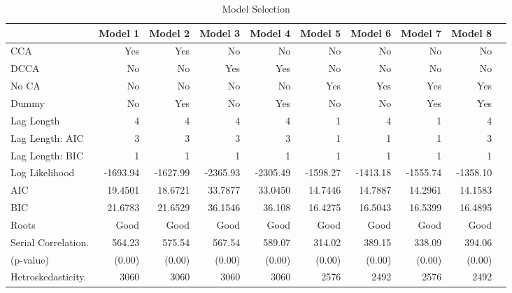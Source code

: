 \documentclass[12pt, a4paper, oneside]{article}\usepackage[]{graphicx}\usepackage[]{color}
\begin{document}
\begin{landscape}
\begin{table}
\begin{threeparttable}
\caption{Model Selection}
\begin{tabular}{p{5cm}rrrrrrrrr}
  \hline
 & Model 1 & Model 2 & Model 3 & Model 4 & Model 5 & Model 6 & Model 7 & Model 8 \\ 
  \hline
  CCA                          & Yes    & Yes         & No     & No    & No           & No    &  No     & No  \\ 
  DCCA                       & No     &  No         & Yes    & Yes   & No          & No     & No      & No  \\ 
  No CA                      & No     &  No        & No      & No   & Yes         & Yes    & Yes     & Yes \\  
  Dummy                     & No     &  Yes       & No     & Yes   & No          & No     & Yes     & Yes \\
  Lag Length               &   4      &  4         & 4         & 4      & 1            &  4       & 1        & 4\\ 
  Lag Length: AIC                     &    3     &  3          & 3         & 3      & 1            & 1        & 1       &  3 \\ 
  Lag Length: BIC                     &   1      &  1          & 1         & 1      & 1             & 1       & 1        & 1\\ 
  Log Likelihood                  & -1693.94  & -1627.99 & -2365.93& -2305.49 & -1598.27 & -1413.18  & -1555.74 & -1358.10  \\ 
  AIC                           & 19.4501   & 18.6721 & 33.7877 & 33.0450  &  14.7446   & 14.7887  & 14.2961 &  14.1583\\
  BIC                           &  21.6783 & 21.6529  & 36.1546  &  36.108  &  16.4275   & 16.5043 & 16.5399 & 16.4895\\
 Roots                        &  Good       &  Good      & Good       & Good     & Good         & Good    & Good        & Good \\
 Serial Correlation.                     &    564.23   & 575.54     & 567.54  & 589.07  &  314.02      & 389.15  &  338.09    &394.06  \\
   (p-value)                            &  (0.00)      &  (0.00)    & (0.00)   &  (0.00)  &  (0.00)       & (0.00)     & (0.00)      & (0.00) \\
 Hetroskedasticity.                          	 &  3060         &  3060       & 3060     & 3060     & 2576       &    2492         & 2576       & 2492     \\

\end{tabular}
\end{threeparttable}
\end{table}
\end{landscape}
\end{document}
